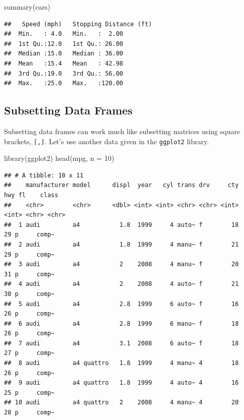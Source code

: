 \documentclass[
]{book}
\newenvironment{Shaded}{\begin{snugshade}}{\end{snugshade}}
\newcommand{\AttributeTok}[1]{\textcolor[rgb]{0.77,0.63,0.00}{#1}}
\newcommand{\DecValTok}[1]{\textcolor[rgb]{0.00,0.00,0.81}{#1}}
\newcommand{\FunctionTok}[1]{\textcolor[rgb]{0.00,0.00,0.00}{#1}}
\newcommand{\NormalTok}[1]{#1}
\begin{document}
\begin{Shaded}
\begin{Highlighting}[]
\FunctionTok{summary}\NormalTok{(cars)}
\end{Highlighting}
\end{Shaded}

\begin{verbatim}
##   Speed (mph)   Stopping Distance (ft)
##  Min.   : 4.0   Min.   :  2.00        
##  1st Qu.:12.0   1st Qu.: 26.00        
##  Median :15.0   Median : 36.00        
##  Mean   :15.4   Mean   : 42.98        
##  3rd Qu.:19.0   3rd Qu.: 56.00        
##  Max.   :25.0   Max.   :120.00
\end{verbatim}

\hypertarget{subsetting-data-frames}{%
\subsection{Subsetting Data Frames}\label{subsetting-data-frames}}

Subsetting data frames can work much like subsetting matrices using square brackets, \texttt{{[},{]}}. Let's use another data given in the \texttt{ggplot2} library.

\begin{Shaded}
\begin{Highlighting}[]
\FunctionTok{library}\NormalTok{(ggplot2)}
\FunctionTok{head}\NormalTok{(mpg, }\AttributeTok{n =} \DecValTok{10}\NormalTok{)}
\end{Highlighting}
\end{Shaded}

\begin{verbatim}
## # A tibble: 10 x 11
##    manufacturer model      displ  year   cyl trans drv     cty   hwy fl    class
##    <chr>        <chr>      <dbl> <int> <int> <chr> <chr> <int> <int> <chr> <chr>
##  1 audi         a4           1.8  1999     4 auto~ f        18    29 p     comp~
##  2 audi         a4           1.8  1999     4 manu~ f        21    29 p     comp~
##  3 audi         a4           2    2008     4 manu~ f        20    31 p     comp~
##  4 audi         a4           2    2008     4 auto~ f        21    30 p     comp~
##  5 audi         a4           2.8  1999     6 auto~ f        16    26 p     comp~
##  6 audi         a4           2.8  1999     6 manu~ f        18    26 p     comp~
##  7 audi         a4           3.1  2008     6 auto~ f        18    27 p     comp~
##  8 audi         a4 quattro   1.8  1999     4 manu~ 4        18    26 p     comp~
##  9 audi         a4 quattro   1.8  1999     4 auto~ 4        16    25 p     comp~
## 10 audi         a4 quattro   2    2008     4 manu~ 4        20    28 p     comp~
\end{verbatim}
\end{document}
